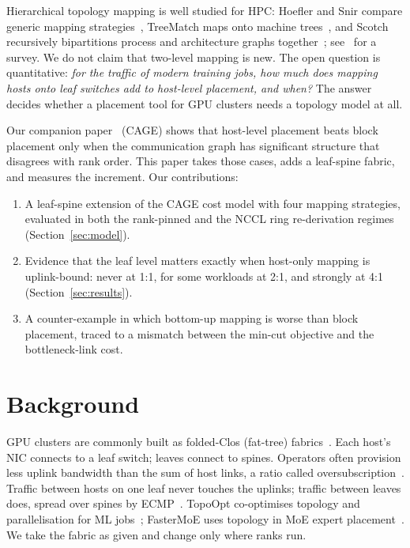 \documentclass[conference]{IEEEtran}
\begin{document}
Hierarchical topology mapping is well studied for HPC: Hoefler and Snir compare generic mapping
strategies~\cite{hoefler2011generic}, TreeMatch maps onto machine trees~\cite{jeannot2014treematch},
and Scotch recursively bipartitions process and architecture graphs
together~\cite{pellegrini1996scotch}; see~\cite{hoefler2014overview} for a survey. We do not claim
that two-level mapping is new. The open question is quantitative: \emph{for the traffic of modern
training jobs, how much does mapping hosts onto leaf switches add to host-level placement, and
when?} The answer decides whether a placement tool for GPU clusters needs a topology model at all.

Our companion paper~\cite{cage2026} (CAGE) shows that host-level placement beats block placement
only when the communication graph has significant structure that disagrees with rank order. This
paper takes those cases, adds a leaf-spine fabric, and measures the increment. Our contributions:
\begin{enumerate}
\item A leaf-spine extension of the CAGE cost model with four mapping strategies, evaluated in both
      the rank-pinned and the NCCL ring re-derivation regimes (Section~\ref{sec:model}).
\item Evidence that the leaf level matters exactly when host-only mapping is uplink-bound: never at
      1:1, for some workloads at 2:1, and strongly at 4:1 (Section~\ref{sec:results}).
\item A counter-example in which bottom-up mapping is worse than block placement, traced to a
      mismatch between the min-cut objective and the bottleneck-link cost.
\end{enumerate}

\section{Background}

GPU clusters are commonly built as folded-Clos (fat-tree) fabrics~\cite{leiserson1985fattrees,
alfares2008fattree}. Each host's NIC connects to a leaf switch; leaves connect to spines. Operators
often provision less uplink bandwidth than the sum of host links, a ratio called
oversubscription~\cite{greenberg2009vl2}. Traffic between hosts on one leaf never touches the
uplinks; traffic between leaves does, spread over spines by ECMP~\cite{rfc2992}. TopoOpt
co-optimises topology and parallelisation for ML jobs~\cite{wang2023topoopt}; FasterMoE uses
topology in MoE expert placement~\cite{he2022fastermoe}. We take the fabric as given and change
only where ranks run.
\end{document}
